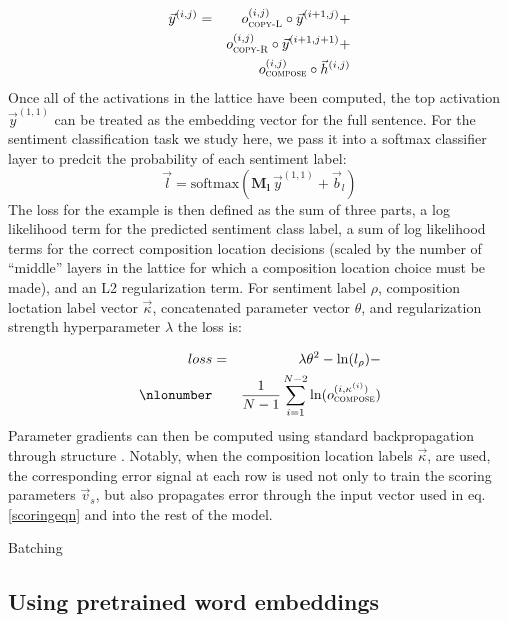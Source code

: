 \begin{eqnarray}
\vec{y}^{(i,j)} & = & o^{(i, j)}_{\textsc{copy-L}} \circ \vec{y}^{(i + 1, j)} +\\
&&\nonumber o^{(i, j)}_{\textsc{copy-R}} \circ \vec{y}^{(i + 1, j + 1)} +\\
&&\nonumber o^{(i, j)}_{\textsc{compose}} \circ \vec{h}^{(i, j)}
\end{eqnarray}
%
Once all of the activations in the lattice have been computed, the top activation $\vec{y}^{(1,1)}$ can be treated as the embedding vector for the full sentence. For the sentiment classification task we study here, we pass it into a softmax classifier layer to predcit the probability of each sentiment label:
%
\begin{equation}
\vec{l} = \text{softmax}(\mathbf{M_l}\,\vec{y}^{(1, 1)} + \vec{b}_l)
\end{equation}
%
The loss for the example is then defined as the sum of three parts, a log likelihood term for the predicted sentiment class label, a sum of log likelihood terms for the correct composition location decisions (scaled by the number of ``middle'' layers in the lattice for which a composition location choice must be made), and an L2 regularization term. For sentiment label $\rho$, composition loctation label vector $\vec{\kappa}$, concatenated parameter vector $\theta$, and regularization strength hyperparameter $\lambda$ the loss is:
%

\begin{eqnarray}
loss & = & \lambda\theta^2 - \ln(l_\rho) -\\
\nlonumber&&\frac{1}{N - 1} \sum_{i = 1}^{N - 2} \ln(o^{(i,\kappa^{(i)})}_{\textsc{compose}})
\end{eqnarray}
%
Parameter gradients can then be computed using standard backpropagation through structure \cite{goller1996learning}. Notably, when the composition location labels $\vec{\kappa}$, are used, the corresponding error signal at each row is used not only to train the scoring parameters $\vec{v}_s$, but also propagates error through the input vector used in eq. \ref{scoringeqn} and into the rest of the model.

Batching

\subsection{Using pretrained word embeddings}

